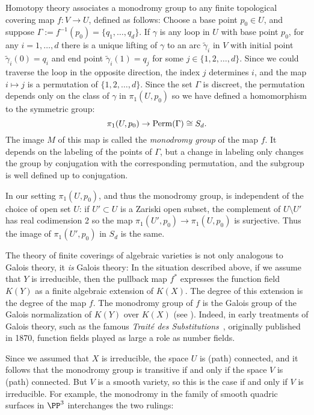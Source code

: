 Homotopy theory  associates a monodromy group to any finite topological covering map $f : V \to U$, defined as follows: Choose a base point $p_0 \in U$, and suppose $\Gamma := f^{-1}(p_0)  = \{q_1,\dots,q_d\}$. If $\gamma$ is any loop in $U$ with base point $p_0$, for any $i = 1, \dots, d$ there is a unique lifting of $\gamma$ to an arc $\tilde \gamma_i$ in $V$ with initial point $\tilde \gamma_i(0) = q_i$ and end point $\tilde \gamma_i(1) = q_j$ for some $j \in \{1,2,\dots,d\}$. Since we could traverse the loop in the opposite direction, the index $j$ determines $i$, and the map $i\mapsto j$ is a permutation of $\{1,2,\dots,d\}$. 
Since the set $\Gamma$ is discreet, the permutation depends only on the class of $\gamma$ in $\pi_1(U,p_0)$ so we have defined a homomorphism to the symmetric group:
$$
\pi_1(U,p_0)  \to {\rm Perm}(\Gamma) \cong S_d.
$$
The image $M$ of this map is called the \emph{monodromy group} of the map $f$. It depends on the labeling of the points of $\Gamma$, but a change in labeling
only changes the group by conjugation with the corresponding permutation, and the subgroup is well defined up to 
conjugation.

\begin{fact}\label{Galois equals monodromy}
In our setting $\pi_1(U,p_0)$, and thus the monodromy group, is independent of the choice of open set $U$: if $U' \subset U$ is a Zariski open subset, the complement of $U\setminus U'$ has
real codimension 2 so the map $\pi_1(U', p_0) \to \pi_1(U,p_0)$ is surjective. Thus the image of $\pi_1(U', p_0)$ in $S_d$ is the same. 

The theory of finite coverings of algebraic varieties is not only analogous to Galois theory, it \emph{is} Galois theory: In the situation described above, if we assume that $Y$ is irreducible, then the pullback map $f^*$ expresses the function field $K(Y)$ as a finite algebraic extension of $K(X)$. The degree of this extension is the degree of the map $f$. The monodromy group of $f$  is the Galois group of the Galois normalization of $K(Y)$ over $K(X)$ (see \cite{Harris1979}). Indeed, in early treatments of Galois theory, such as the famous \emph{Trait\'e des Substitutions}~\cite{MR1188877}, originally published in 1870, function fields played as large a role as number fields.
\end{fact}

Since we assumed that $X$ is irreducible, the space $U$ is (path) connected, and it follows that the monodromy group is transitive if and only if the space $V$ is (path) connected. But $V$ is a smooth
variety, so this is the case if and only if $V$ is irreducible. For example, the monodromy in the family
of smooth quadric surfaces in $\PP^3$ interchanges the two rulings:

